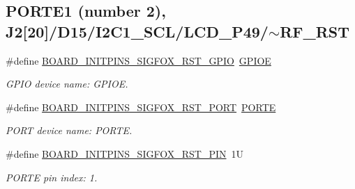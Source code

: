 \subsection*{P\+O\+R\+T\+E1 (number 2), J2\mbox{[}20\mbox{]}/\+D15/\+I2\+C1\+\_\+\+S\+C\+L/\+L\+C\+D\+\_\+\+P49/$\sim$\+R\+F\+\_\+\+R\+ST}
\begin{DoxyCompactItemize}
\item 
\mbox{\label{group__pin__mux_ga9c1444e3c94f81aa7201c41e839562e1}} 
\#define \mbox{\hyperlink{group__pin__mux_ga9c1444e3c94f81aa7201c41e839562e1}{B\+O\+A\+R\+D\+\_\+\+I\+N\+I\+T\+P\+I\+N\+S\+\_\+\+S\+I\+G\+F\+O\+X\+\_\+\+R\+S\+T\+\_\+\+G\+P\+IO}}~\mbox{\hyperlink{group___g_p_i_o___peripheral___access___layer_gae04bdb5e8acc47cab1d0532e6b0d0763}{G\+P\+I\+OE}}
\begin{DoxyCompactList}\small\item\em G\+P\+IO device name\+: G\+P\+I\+OE. \end{DoxyCompactList}\item 
\mbox{\label{group__pin__mux_ga1c7859a6709480cc0799a90df58406ff}} 
\#define \mbox{\hyperlink{group__pin__mux_ga1c7859a6709480cc0799a90df58406ff}{B\+O\+A\+R\+D\+\_\+\+I\+N\+I\+T\+P\+I\+N\+S\+\_\+\+S\+I\+G\+F\+O\+X\+\_\+\+R\+S\+T\+\_\+\+P\+O\+RT}}~\mbox{\hyperlink{group___p_o_r_t___peripheral___access___layer_ga7e2386d3b1084b5b875ae3696f550ba9}{P\+O\+R\+TE}}
\begin{DoxyCompactList}\small\item\em P\+O\+RT device name\+: P\+O\+R\+TE. \end{DoxyCompactList}\item 
\mbox{\label{group__pin__mux_ga5b35f3d0739caa189b4e74ced3b1e0b0}} 
\#define \mbox{\hyperlink{group__pin__mux_ga5b35f3d0739caa189b4e74ced3b1e0b0}{B\+O\+A\+R\+D\+\_\+\+I\+N\+I\+T\+P\+I\+N\+S\+\_\+\+S\+I\+G\+F\+O\+X\+\_\+\+R\+S\+T\+\_\+\+P\+IN}}~1U
\begin{DoxyCompactList}\small\item\em P\+O\+R\+TE pin index\+: 1. \end{DoxyCompactList}\end{DoxyCompactItemize}

